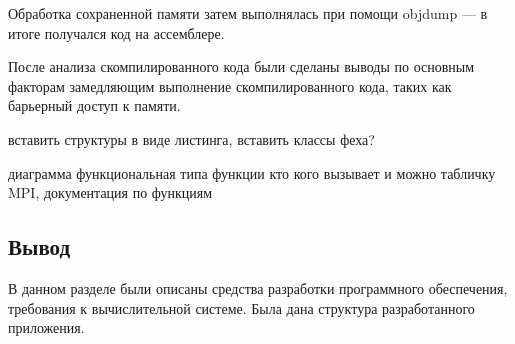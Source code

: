 Обработка сохраненной памяти затем выполнялась при помощи objdump --- в итоге получался код на ассемблере.

После анализа скомпилированного кода были сделаны выводы по основным факторам замедляющим выполнение скомпилированного кода, таких как барьерный доступ к памяти.

вставить структуры в виде листинга, вставить классы феха?

диаграмма функциональная типа функции кто кого вызывает и можно табличку MPI, документация по функциям

\subsection{Вывод}

В данном разделе были описаны средства разработки программного
обеспечения, требования к вычислительной системе. Была дана структура
разработанного приложения.

\pagebreak